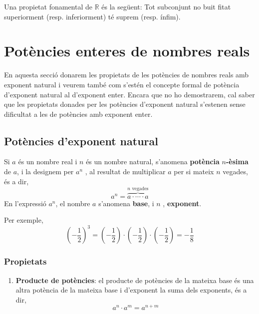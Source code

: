 Una propietat fonamental de $\mathbb{R}$ és la següent: Tot subconjunt
no buit fitat superiorment (resp. inferiorment) té suprem
(resp. ínfim).

\section{Potències enteres de nombres reals}

En aquesta secció donarem les propietats de les potències de nombres
reals amb exponent natural i veurem també com s’estén el
concepte formal de potència d’exponent natural al d’exponent enter.
Encara que no ho demostrarem, cal saber que les propietats donades per les
potències d’exponent natural s’estenen sense dificultat a les de
potències amb exponent enter.

\subsection{Potències d’exponent natural}

Si $a$ és un nombre real i $n$ és un nombre natural, s’anomena 
\textbf{potència }$n$\textbf{-èsima} de $a$, i la designem per $a^{n}$%
, al resultat de multiplicar $a$ per si mateix $n$ vegades, és a dir,%
\begin{equation*}
a^{n}=\overset{n\text{ vegades}}{\overbrace{a\cdot \cdots \cdot a}}
\end{equation*}%
En l’expressió $a^{n}$, el nombre $a$ s’anomena \textbf{base}, i $n$%
, \textbf{exponent}.

Per exemple,%
\begin{equation*}
\left( -\frac{1}{2}\right) ^{3}=\left( -\frac{1}{2}\right) \cdot \left( -%
\frac{1}{2}\right) \cdot \left( -\frac{1}{2}\right) =-\frac{1}{8}
\end{equation*}

\subsubsection{Propietats}

\begin{enumerate}
\item \textbf{Producte de potències}: el producte de potències de la mateixa
base és una altra potència de la mateixa base i d’exponent la suma dels
exponents, és a dir,%
\begin{equation*}
a^{n}\cdot a^{m}=a^{n+m}
\end{equation*}
\end{enumerate}

